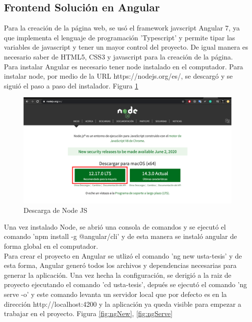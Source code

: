     \subsection{Frontend Solución en Angular}
        
        Para la creación de la página web, se usó el framework javscript Angular 7, ya que implementa el lenguaje de programación 'Typescript' y permite tipar las variables de javascript y tener un mayor control del proyecto. De igual manera es necesario saber de HTML5, CSS3 y javascript para la creación de la página.\\
        Para instalar Angular es necesario tener node instalado en el computador. Para instalar node, por medio de la URL https://nodejs.org/es/, se descargó y se siguió el paso a paso del instalador. Figura \ref{fig:node} \\

        \begin{figure}[H]
            \begin{center}
                \includegraphics[width = 15cm]{3Proyecto/node}
                \caption{ Descarga de Node JS } 
                \label{fig:node}
           \end{center}
        \end{figure}

        Una vez instalado Node, se abrió una consola de comandos y se ejecutó el comando 'npm install -g @angular/cli' y de esta manera se instaló angular de forma global en el computador.\\

        Para crear el proyecto en Angular se utlizó el comando 'ng new usta-tesis' y de esta forma, Angular generó todos los archivos y dependencias necesarias para generar la aplicación. Una vez hecha la configuración, se derigió a la raiz de proyecto ejecutando el comando 'cd usta-tesis', depués se ejecutó el comando 'ng serve -o' y este comando levanta un servidor local que por defecto es en la dirección http://localhost:4200 y la aplicación ya queda visible para empezar a trabajar en el proyecto. Figura \ref{fig:ngNew}, \ref{fig:ngServe}\\

